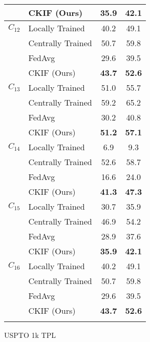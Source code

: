 \begin{table}[t]
\begin{subtable}{0.49\linewidth}
{\begin{tabular}{llcc}
                       & CKIF (Ours)     & \textbf{35.9} & \textbf{42.1} \\
        \midrule
        $C_{12}$ & Locally Trained   & 40.2 & 49.1 \\
                       & Centrally Trained & 50.7 & 59.8 \\
                       & FedAvg   & 29.6 & 39.5 \\
                       & CKIF (Ours)     & \textbf{43.7} & \textbf{52.6} \\
        \midrule
        $C_{13}$ & Locally Trained   & 51.0 & 55.7 \\
                       & Centrally Trained & 59.2 & 65.2 \\
                       & FedAvg   & 30.2 & 40.8 \\
                       & CKIF (Ours)     & \textbf{51.2} & \textbf{57.1} \\
        \midrule
        $C_{14}$ & Locally Trained   & 6.9 & 9.3 \\
                       & Centrally Trained & 52.6 & 58.7 \\
                       & FedAvg   & 16.6 & 24.0 \\
                       & CKIF (Ours)     & \textbf{41.3} & \textbf{47.3} \\
        \midrule
        $C_{15}$ & Locally Trained   & 30.7 & 35.9 \\
                       & Centrally Trained & 46.9 & 54.2 \\
                       & FedAvg   & 28.9 & 37.6 \\
                       & CKIF (Ours)     & \textbf{35.9} & \textbf{42.1} \\
        \midrule
        $C_{16}$ & Locally Trained   & 40.2 & 49.1 \\
                       & Centrally Trained & 50.7 & 59.8 \\
                       & FedAvg   & 29.6 & 39.5 \\
                       & CKIF (Ours)     & \textbf{43.7} & \textbf{52.6} \\
        \botrule
    \end{tabular}
    }
    \caption{USPTO 1k TPL}
    \label{tab:t_rt_2_2}
    \end{subtable}

    \caption{}
    \label{tab:t_rt_2}
\end{table}

